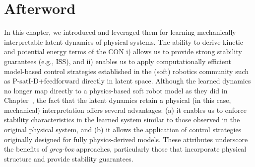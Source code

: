 \newpage








\section*{Afterword}
In this chapter, we introduced  and leveraged them for learning mechanically interpretable latent dynamics of physical systems.
The ability to derive kinetic and potential energy terms of the \gls{CON} i) allows us to provide strong stability guarantees (e.g., \gls{ISS}), and ii) enables us to apply computationally efficient model-based control strategies established in the (soft) robotics community such as P-satI-D+feedforward directly in latent space.
Although the learned dynamics no longer map directly to a physics-based soft robot model as they did in Chapter~\circled{\ref{chp:pcsregression}}, the fact that the latent dynamics retain a physical (in this case, mechanical) interpretation offers several advantages: (a) it enables us to enforce stability characteristics in the learned system similar to those observed in the original physical system, and (b) it allows the application of control strategies originally designed for fully physics-derived models. These attributes underscore the benefits of \emph{grey-box} approaches, particularly those that incorporate physical structure and provide stability guarantees.

